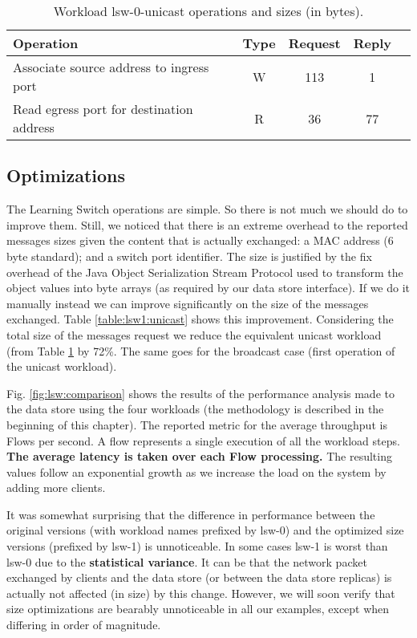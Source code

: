 \begin{table}[ht]
\small
\centering 
\begin{tabular}{l c c c c}
 Operation & Type & Request & Reply  \\ \toprule 
Associate source address to ingress port & W & 113 & 1\\
Read egress port for destination address & R & 36 & 77 \\
\end{tabular}
\caption[Workload lsw-0-unicast operations]{Workload lsw-0-unicast operations and sizes (in bytes).}
\label{table:lsw0:unicast}
\end{table}

\subsection{Optimizations}
The Learning Switch operations are simple. So there is not much we should do to improve them. 
Still, we noticed that there is an extreme overhead to the reported messages sizes given the content that is actually exchanged: a MAC address (6 byte standard); and  a switch port identifier.  
The size is justified by the fix overhead of the Java Object Serialization Stream Protocol used to transform the object values into byte arrays (as required by our data store interface). 
If we do it manually instead we can improve  significantly on the size of the messages exchanged. Table  \ref{table:lsw1:unicast} shows this improvement. 
Considering the total size of the messages request  we reduce the equivalent unicast workload (from Table \ref{table:lsw0:unicast} by 72\%. The same goes for the broadcast case (first operation of the unicast workload). 

Fig. \ref{fig:lsw:comparison} shows the results of the performance analysis made to the data store using the four workloads (the methodology is described in the beginning of this chapter). 
The reported metric for the average throughput  is Flows per second.
A flow represents a single execution of all the workload steps. 
\textbf{The average latency is taken over each Flow processing. }
The resulting values follow an exponential growth as we increase the load on the system by adding more clients. 

It was somewhat surprising that the difference in performance between the original versions (with workload names prefixed by lsw-0) and the optimized size versions (prefixed by lsw-1) is unnoticeable. In some cases lsw-1 is worst than lsw-0 due to the \textbf{statistical variance}. 
It can be that the network packet exchanged by clients and the data store (or between the data store replicas) is actually not affected (in size) by this change. 
However, we will soon verify that size optimizations are bearably unnoticeable in all our examples, except when differing in order of magnitude. 


